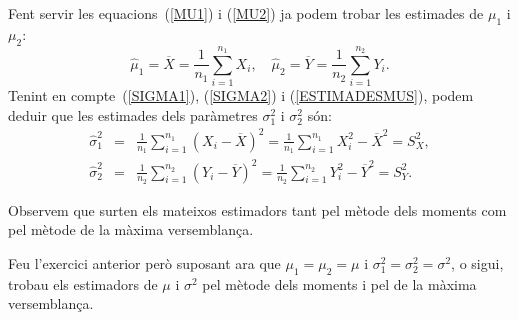 {\begin{itemize}
\begin{itemize}
	Fent servir les equacions~(\ref{MU1}) i (\ref{MU2}) ja podem trobar les estimades de $\mu_1$ 
	i $\mu_2$:
	\begin{equation}
	\hat{\mu}_1=\overline{X}=\frac{1}{n_1}\sum_{i=1}^{n_1} X_i,\quad 
	\hat{\mu}_2=\overline{Y}=\frac{1}{n_2}\sum_{i=1}^{n_2} Y_i.
	\label{ESTIMADESMUS}
    \end{equation}
    Tenint en compte~(\ref{SIGMA1}), (\ref{SIGMA2}) i (\ref{ESTIMADESMUS}), 
    podem deduir que les estimades dels par\`ametres $\sigma_1^2$ i 
    $\sigma_2^2$ s\'on:
    \begin{eqnarray*}
    \hat{\sigma}_1^2 & = & \frac{1}{n_1}\sum_{i=1}^{n_1} {(X_i 
    -\overline{X})}^2 =\frac{1}{n_1} \sum_{i=1}^{n_1} X_i^2 
    -{\overline{X}}^2=S_X^2, \\ 
    \hat{\sigma}_2^2 & = & \frac{1}{n_2}\sum_{i=1}^{n_2} {(Y_i 
    -\overline{Y})}^2 =\frac{1}{n_2} \sum_{i=1}^{n_2} Y_i^2 
    -{\overline{Y}}^2 = S_Y^2.
    \end{eqnarray*}
\end{itemize}
\end{itemize}
Observem que surten els mateixos estimadors tant pel m\`etode dels 
moments com pel m\`etode de la m\`axima versemblan\c{c}a.}

\begin{probres}
{Feu l'exercici anterior per\`o suposant ara que $\mu_1=\mu_2=\mu$ i
$\sigma_1^2 =\sigma_2^2 =\sigma^2$, o sigui, trobau els estimadors de $\mu$ i
$\sigma^2$ pel m\`etode dels moments i pel de la m\`axima versemblan\c{c}a.}
\end{probres}

